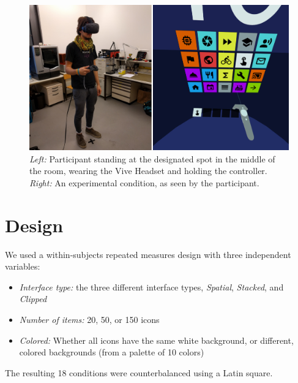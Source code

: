 \documentclass[nobib]{tufte-book} %
\begin{document}
\begin{figure}
  \includegraphics{participant+view.png}
  \caption{\emph{Left:} Participant standing at the designated spot in the middle of the room, wearing the Vive Headset and holding the controller. \emph{Right:} An experimental condition, as seen by the participant.}
  \label{fig:participant-view}
\end{figure}

\section{Design}
We used a within-subjects repeated measures design with three independent variables:

\begin{itemize}
  \item \emph{Interface type:} the three different interface types, \emph{Spatial}, \emph{Stacked}, and \emph{Clipped}
  \item \emph{Number of items:} 20, 50, or 150 icons
  \item \emph{Colored:} Whether all icons have the same white background, or different, colored backgrounds (from a palette of 10 colors)
\end{itemize}

The resulting 18 conditions were counterbalanced using a Latin square.
\end{document}
